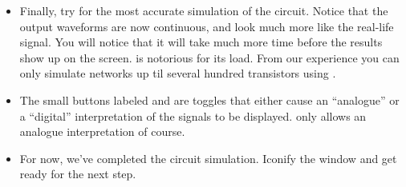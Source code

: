 \begin{itemize}
\item
Finally, try  
for the most accurate simulation of the
circuit.  Notice that the output waveforms are now continuous, and
look much more like the real-life signal. You will notice that it
will take much more time before the results show up on the screen.
 is notorious for its load.  From our experience you can
only simulate networks up til several hundred transistors using .

\item
The small buttons labeled  and  
are toggles that either
cause an ``analogue'' or a ``digital'' interpretation of the signals to be
displayed.  only allows an analogue interpretation of course.

\item
For now, we've completed the circuit simulation. Iconify the window
and get ready for the next step.
\end{itemize}

